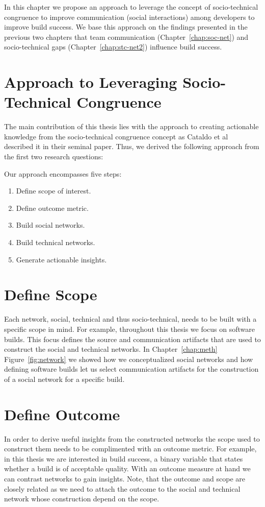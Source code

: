 \label{chap:approach}
In this chapter we propose an approach to leverage the concept of socio-technical congruence to improve communication (social interactions) among developers to improve build success.
We base this approach on the findings presented in the previous two chapters that team communication (Chapter~\ref{chap:soc-net}) and socio-technical gaps (Chapter~\ref{chap:stc-net2})  influence build success.

\section{Approach to Leveraging Socio-Technical Congruence}
The main contribution of this thesis lies with the approach to creating actionable knowledge from the socio-technical congruence concept as Cataldo et al~\cite{cataldo:cscw:2006} described it in their seminal paper.
Thus, we derived the following approach from the first two research questions:

Our approach encompasses five steps:
\begin{enumerate}
\item Define scope of interest.
\item Define outcome metric.
\item Build social networks.
\item Build technical networks.
\item Generate actionable insights.
\end{enumerate}

\section{Define Scope} 
Each network, social, technical and thus socio-technical, needs to be built with a specific scope in mind.
For example, throughout this thesis we focus on software builds.
This focus defines the source and communication artifacts that are used to construct the social and technical networks.
In Chapter~\ref{chap:meth} Figure~\ref{fig:network} we showed how we conceptualized social networks and how defining software builds let us select communication artifacts for the construction of a social network for a specific build.

\section{Define Outcome}
In order to derive useful insights from the constructed networks the scope used to construct them needs to be complimented with an outcome metric.
For example, in this thesis we are interested in build success, a binary variable that states whether a build is of acceptable quality.
With an outcome measure at hand we can contrast networks to gain insights.
Note, that the outcome and scope are closely related as we need to attach the outcome to the social and technical network whose construction depend on the scope.

